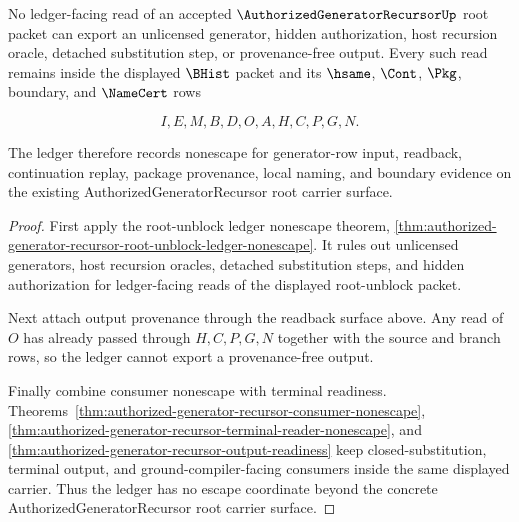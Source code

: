 \begin{theorem}
\label{thm:authorized-generator-recursor-ledger-nonescape-surface}
No ledger-facing read of an accepted $\AuthorizedGeneratorRecursorUp$ root packet can export an unlicensed generator, hidden authorization, host recursion oracle, detached substitution step, or provenance-free output. Every such read remains inside the displayed $\BHist$ packet and its $\hsame$, $\Cont$, $\Pkg$, boundary, and $\NameCert$ rows

$$
I,E,M,B,D,O,A,H,C,P,G,N.
$$

The ledger therefore records nonescape for generator-row input, readback, continuation replay, package provenance, local naming, and boundary evidence on the existing AuthorizedGeneratorRecursor root carrier surface.
\end{theorem}
\begin{proof}
First apply the root-unblock ledger nonescape theorem, \autoref{thm:authorized-generator-recursor-root-unblock-ledger-nonescape}. It rules out unlicensed generators, host recursion oracles, detached substitution steps, and hidden authorization for ledger-facing reads of the displayed root-unblock packet.

Next attach output provenance through the readback surface above. Any read of $O$ has already passed through $H,C,P,G,N$ together with the source and branch rows, so the ledger cannot export a provenance-free output.

Finally combine consumer nonescape with terminal readiness. Theorems~\ref{thm:authorized-generator-recursor-consumer-nonescape}, \ref{thm:authorized-generator-recursor-terminal-reader-nonescape}, and \ref{thm:authorized-generator-recursor-output-readiness} keep closed-substitution, terminal output, and ground-compiler-facing consumers inside the same displayed carrier. Thus the ledger has no escape coordinate beyond the concrete AuthorizedGeneratorRecursor root carrier surface.
\end{proof}

